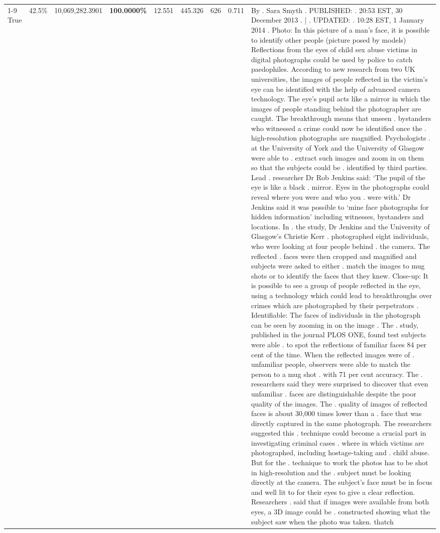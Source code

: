 \begin{table}[H]
\begin{tabular}{lllrlllll}
\cline{1-9}
True & 42.5\% & 10,069,282.3901 & \bfseries \color{red} 100.0000\% & 12.551 & 445.326 & 626 & 0.711 & By . Sara Smyth . PUBLISHED: . 20:53 EST, 30 December 2013 . | . UPDATED: . 10:28 EST, 1 January 2014 . Photo: In this picture of a man's face, it is possible to identify other people (picture posed by models) Reflections from the eyes of child sex abuse victims in digital photographs could be used by police to catch paedophiles. According to new research from two UK universities, the images of people reflected in the victim's eye can be identified with the help of advanced camera technology. The eye's pupil acts like a mirror in which the images of people standing behind the photographer are caught. The breakthrough means that unseen . bystanders who witnessed a crime could now be identified once the . high-resolution photographs are magnified. Psychologists . at the University of York and the University of Glasgow were able to . extract such images and zoom in on them so that the subjects could be . identified by third parties. Lead . researcher Dr Rob Jenkins said: ‘The pupil of the eye is like a black . mirror. Eyes in the photographs could reveal where you were and who you . were with.' Dr Jenkins said it was possible to ‘mine face photographs for hidden information' including witnesses, bystanders and locations. In . the study, Dr Jenkins and the University of Glasgow's Christie Kerr . photographed eight individuals, who were looking at four people behind . the camera. The reflected . faces were then cropped and magnified and subjects were asked to either . match the images to mug shots or to identify the faces that they knew. Close-up: It is possible to see a group of people reflected in the eye, using a technology which could lead to breakthroughs over crimes which are photographed by their perpetrators . Identifiable: The faces of individuals in the photograph can be seen by zooming in on the image . The . study, published in the journal PLOS ONE, found test subjects were able . to spot the reflections of familiar faces 84 per cent of the time. When the reflected images were of . unfamiliar people, observers were able to match the person to a mug shot . with 71 per cent accuracy. The . researchers said they were surprised to discover that even unfamiliar . faces are distinguishable despite the poor quality of the images. The . quality of images of reflected faces is about 30,000 times lower than a . face that was directly captured in the same photograph. The researchers suggested this . technique could become a crucial part in investigating criminal cases . where in which victims are photographed, including hostage-taking and . child abuse. But for the . technique to work the photos has to be shot in high-resolution and the . subject must be looking directly at the camera. The subject's face must be in focus and well lit to for their eyes to give a clear reflection. Researchers . said that if images were available from both eyes, a 3D image could be . constructed showing what the subject saw when the photo was taken. thatch \\

\end{tabular}
\end{table}
